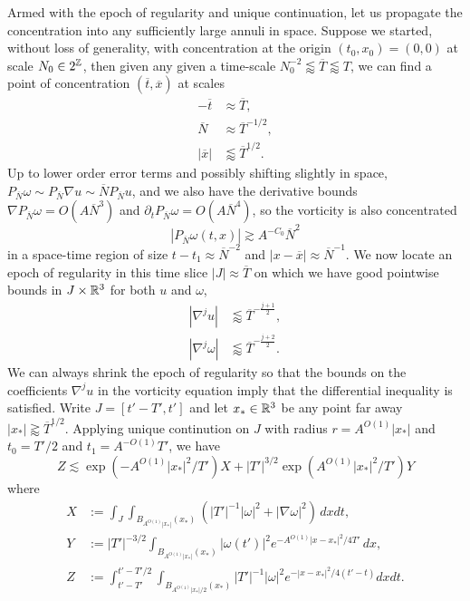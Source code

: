 Armed with the epoch of regularity and unique continuation, let us propagate the concentration into any sufficiently large annuli in space. Suppose we started, without loss of generality, with concentration at the origin $(t_0, x_0) = (0, 0)$ at scale $N_0 \in 2^\mathbb Z$, then given any given a time-scale $N_0^{-2}\lessapprox \overline T \lessapprox T$, we can find a point of concentration $(\overline t, \overline x)$ at scales
		\begin{align*}
			 - \overline t
				&\approx \overline T,\\
			\overline N
				&\approx {\overline T}^{-1/2},\\
			|\overline x|
				&\lessapprox {\overline T}^{1/2}.
		\end{align*}
Up to lower order error terms and possibly shifting slightly in space, $P_{\overline N} \omega \sim P_{\overline N} \nabla u \sim \overline N P_{\overline N} u$, and we also have the derivative bounds $\nabla P_{\overline N} \omega = O(A \overline N^3)$ and $\partial_t P_{\overline N} \omega = O(A \overline N^4)$, so the vorticity is also concentrated
	\[
		|P_{\overline N} \omega (t, x)| \gtrsim A^{-C_0} \overline N^2
	\]
in a space-time region of size $t - t_1 \approx \overline N^{-2}$ and $|x - \overline x| \approx \overline N^{-1}$. We now locate an epoch of regularity in this time slice $|J| \approx \overline T$ on which we have good pointwise bounds in $J \times \mathbb R^3$ for both $u$ and $\omega$, 
	\begin{align*}
		|\nabla^j u|
			&\lessapprox \overline T^{-\frac{j + 1}{2}}, \\
		|\nabla^j \omega|
			&\lessapprox \overline T^{-\frac{j + 2}{2}}.
	\end{align*}
We can always shrink the epoch of regularity so that the bounds on the coefficients $\nabla^j u$ in the vorticity equation imply that the differential inequality is satisfied. Write $J = [t' - T', t']$ and let $x_* \in \mathbb R^3$ be any point far away $|x_*| \gtrapprox \overline T^{1/2}$. Applying unique continution on $J$ with radius $r = A^{O(1)} |x_*|$ and $t_0 = T'/2$ and $t_1 = A^{-O(1)}T'$, we have
	\[
		Z \lesssim \exp (-A^{O(1)} |x_*|^2 / T') X + |T'|^{3/2} \exp(A^{O(1)} |x_*|^2/T') Y
	\]
where
	\begin{align*}
		X
			&:= \int_{J} \int_{B_{A^{O(1)} |x_*|} (x_*) } (|T'|^{-1} |\omega|^2 + |\nabla \omega|^2) \, dx dt,\\
		Y
			&:= |T'|^{-3/2} \int_{B_{A^{O(1)}|x_*|}  (x_*)} |\omega(t')|^2 e^{-A^{O(1)} |x - x_*|^2/4T'} \, dx,\\
		Z
			&:=\int_{t' - T'}^{t' - T'/2} \int_{B_{A^{O(1)}|x_*|/2}  (x_*)}	 |T'|^{-1} |\omega|^2 e^{-|x - x_*|^2/4(t' - t)} dx dt.
	\end{align*}	
